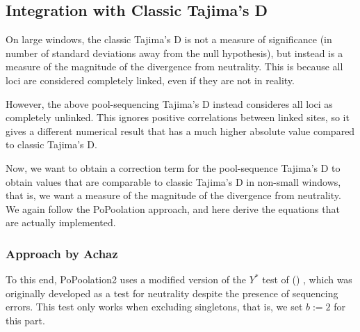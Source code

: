 \documentclass[a4paper,fontsize=9pt,DIV=14]{scrartcl}
\newcounter{todo}
\newcommand\todo[1]{{\stepcounter{todo}\color{purple}{TODO \arabic{todo}: #1}}}
\newcommand\citeay[1]{\citeauthor{#1} (\citeyear{#1}) \cite{#1}}
\begin{document}


\subsection{Integration with Classic Tajima's D}
\label{supp:sec:TajimaD:sub:Classic}

On large windows, the classic Tajima's D is not a measure of significance (in number of standard deviations away from the null hypothesis), but instead is a measure of the magnitude of the divergence from neutrality.
This is because all loci are considered completely linked, even if they are not in reality.

However, the above pool-sequencing Tajima's D instead consideres all loci as completely unlinked.
This ignores positive correlations between linked sites, so it gives a different numerical result that has a much higher absolute value compared to classic Tajima's D.

Now, we want to obtain a correction term for the pool-sequence Tajima's D to obtain values that are comparable to classic Tajima's D in non-small windows, that is, we want a measure of the magnitude of the divergence from neutrality.
We again follow the PoPoolation approach, and here derive the equations that are actually implemented.


\subsubsection*{Approach by Achaz}

To this end, PoPoolation2 uses a modified version of the $Y^*$ test of \citeay{Achaz2008},
which was originally developed as a test for neutrality despite the presence of sequencing errors.
This test only works when excluding singletons, that is, we set $b:=2$ for this part.
\end{document}
